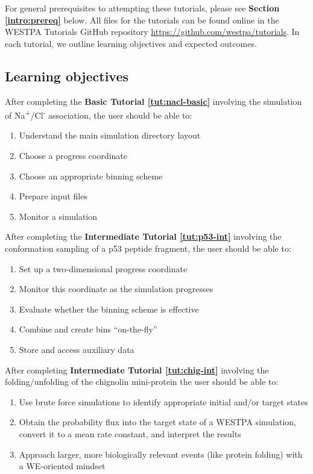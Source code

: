 For general prerequisites to attempting these tutorials, please see \textbf{Section \ref{intro:prereq}} below.
All files for the tutorials can be found online in the WESTPA Tutorials GitHub repository {\url{https://github.com/westpa/tutorials}}. 
In each tutorial, we outline learning objectives and expected outcomes. 


\subsection{Learning objectives}
After completing the \textbf{Basic Tutorial \ref{tut:nacl-basic}} involving the simulation of Na\textsuperscript{+}/Cl\textsuperscript{-} association, the user should be able to: 
\begin{enumerate}
\item Understand the main simulation directory layout
\item Choose a progress coordinate
\item Choose an appropriate binning scheme
\item Prepare input files
\item Monitor a simulation
\end{enumerate}

After completing the \textbf{Intermediate Tutorial \ref{tut:p53-int}} involving the conformation sampling of a p53 peptide fragment, the user should be able to:
\begin{enumerate}
\item Set up a two-dimensional progress coordinate
\item Monitor this coordinate as the simulation progresses
\item Evaluate whether the binning scheme is effective
\item Combine and create bins “on-the-fly”
\item Store and access auxiliary data
\end{enumerate}

After completing \textbf{Intermediate Tutorial \ref{tut:chig-int}} involving the folding/unfolding of the chignolin mini-protein the user should be able to:
\begin{enumerate}
\item Use brute force simulations to identify appropriate initial and/or target states
\item Obtain the probability flux into the target state of a WESTPA simulation, convert it to a mean rate constant, and interpret the results
\item Approach larger, more biologically relevant events (like protein folding) with a WE-oriented mindset
\end{enumerate}


